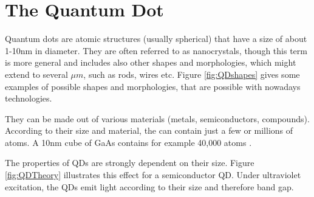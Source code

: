 \chapter{The Quantum Dot}

	Quantum dots are atomic structures (usually spherical) that have a size of about 1-10nm in diameter. They are often referred to as nanocrystals, though this
	term is more general and includes also other shapes and morphologies, which might extend to several $\mu m$, such as rods, wires etc.
	Figure \ref{fig:QDshapes} gives some examples of possible shapes and morphologies, that are possible with nowadays technologies.
	
	They can be made out of various materials (metals, semiconductors, compounds). According to their size and material, the can contain just a few or millions
	of atoms. A 10nm cube of GaAs contains for example 40,000 atoms \cite{SalehTeich}.
	
	The properties of \glspl{QD} are strongly dependent on their size. Figure \ref{fig:QDTheory} illustrates this effect for a semiconductor \gls{QD}.
	Under ultraviolet excitation, the \glspl{QD} emit light according to their size and therefore band gap.
	
